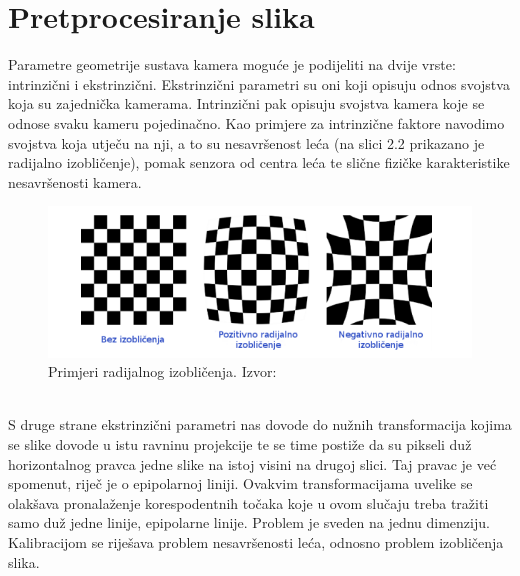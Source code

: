 \documentclass[times, utf8, zavrsni, numeric]{fer}
\begin{document}
\section{Pretprocesiranje slika}
Parametre geometrije sustava kamera moguće je  podijeliti na dvije vrste: intrinzični i ekstrinzični. Ekstrinzični parametri su oni koji opisuju odnos svojstva koja su zajednička kamerama. Intrinzični pak opisuju svojstva kamera koje se odnose svaku kameru pojedinačno. Kao primjere za intrinzične faktore navodimo svojstva koja utječu na nji, a to su nesavršenost leća (na slici 2.2 prikazano je radijalno izobličenje), pomak senzora od centra leća te slične fizičke karakteristike nesavršenosti kamera.\\
\begin{figure}[htb]
\centering
\includegraphics[scale=0.7]{img/slika2.png}
\caption{Primjeri radijalnog izobličenja. Izvor:\citep{bunjevac2017stereo}}
\label{fig:Radial}
\end{figure}\\
S druge strane ekstrinzični parametri nas dovode do nužnih transformacija kojima se slike dovode u istu ravninu projekcije te se time postiže da su pikseli duž horizontalnog pravca jedne slike na istoj visini na drugoj slici. Taj pravac je već spomenut, riječ je o epipolarnoj liniji. Ovakvim transformacijama uvelike se olakšava pronalaženje korespodentnih točaka koje u ovom slučaju treba tražiti samo duž jedne linije, epipolarne linije. Problem je sveden na jednu dimenziju. Kalibracijom se riješava problem nesavršenosti leća, odnosno problem izobličenja slika.\\
\\
\end{document}
